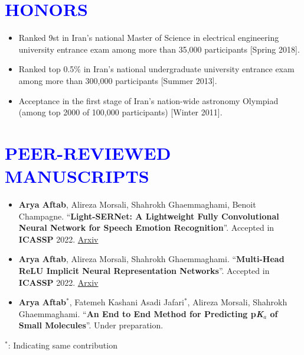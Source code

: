\documentclass[letterpaper,11pt]{article}
\newcommand{\resumeSubHeadingListStart}{\begin{itemize}[leftmargin=0.0in, label={}]}
\begin{document}
\section{\textcolor{blue}{HONORS}}
        \begin{itemize}[itemsep=-2pt, parsep=5pt]
            \item Ranked 9st in Iran’s national Master of Science in electrical engineering university entrance exam among more than 35,000 participants [Spring 2018].
            \item Ranked top 0.5\% in Iran’s national undergraduate university entrance exam among more than 300,000 participants [Summer 2013].
            \item Acceptance in the first stage of Iran’s nation-wide astronomy Olympiad (among top 2000 of 100,000 participants) [Winter 2011].

        \end{itemize}
 
 
\section{\textcolor{blue}{PEER-REVIEWED MANUSCRIPTS}}
        \begin{itemize}[itemsep=0pt, parsep=5pt]
            \item \textbf{Arya Aftab}, Alireza Morsali, Shahrokh Ghaemmaghami, Benoit Champagne. “\textbf{Light-SERNet: A Lightweight Fully Convolutional Neural Network for Speech Emotion Recognition}”. Accepted in \textbf{ICASSP} 2022. \href{https://arxiv.org/pdf/2110.03435.pdf}{Arxiv {\raisebox{-0.1\height}\faExternalLink }}
            \item \textbf{Arya Aftab}, Alireza Morsali, Shahrokh Ghaemmaghami. “\textbf{Multi-Head ReLU Implicit Neural Representation Networks}”. Accepted in \textbf{ICASSP} 2022. \href{https://arxiv.org/pdf/2110.03448.pdf}{Arxiv {\raisebox{-0.1\height}\faExternalLink }}
            \item \textbf{Arya Aftab$^*$}, Fatemeh Kashani Asadi Jafari$^*$, Alireza Morsali, Shahrokh Ghaemmaghami. “\textbf{An End to End Method for Predicting p\textit{K}$_{a}$ of Small Molecules}”. Under preparation.
        \end{itemize}
        $^*$: Indicating same contribution
\end{document}
